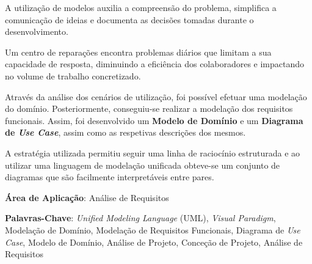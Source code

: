 \documentclass[a4paper,12pt]{scrreprt}
\begin{document}

\makecover




\renewenvironment{abstract}
{\par\noindent\textbf{\Large\abstractname}\par\bigskip}
{}

\begin{flushleft}
    \begin{abstract}
        A utilização de modelos auxilia a compreensão do problema, simplifica a comunicação de ideias e documenta as decisões tomadas durante o desenvolvimento.
        
        Um centro de reparações encontra problemas diários que limitam a sua capacidade de resposta,
        diminuindo a eficiência dos colaboradores e impactando no volume de trabalho concretizado.
        
        Através da análise dos cenários de utilização, foi possível efetuar uma modelação do domínio.
        Posteriormente, conseguiu-se realizar a modelação dos requisitos funcionais.
        Assim, foi desenvolvido um \textbf{Modelo de Domínio} e um \textbf{Diagrama de \textit{Use Case}},
        assim como as respetivas descrições dos mesmos.
    
        A estratégia utilizada permitiu seguir uma linha de raciocínio estruturada e ao utilizar uma linguagem de modelação unificada obteve-se
        um conjunto de diagramas que são facilmente interpretáveis entre pares.

        \par \textbf{Área de Aplicação}: Análise de Requisitos
        \par \textbf{Palavras-Chave}: \textit{Unified Modeling Language} (UML), \textit{Visual Paradigm}, Modelação de Domínio, Modelação de Requisitos Funcionais, Diagrama de \textit{Use Case}, Modelo de Domínio, Análise de Projeto, Conceção de Projeto, Análise de Requisitos
    \end{abstract}
\end{flushleft}
\end{document}
